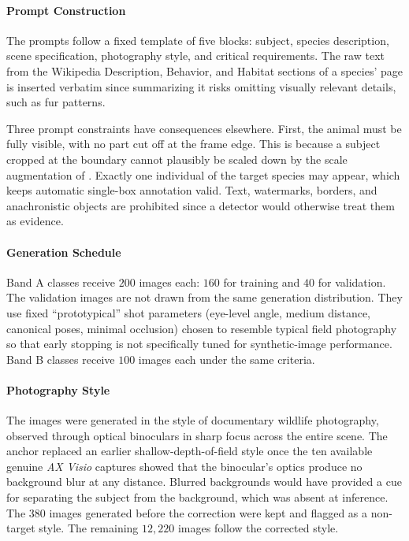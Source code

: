 \paragraph{Prompt Construction}
The prompts follow a fixed template of five blocks: subject, species description, scene specification, photography style, and critical requirements. The raw text from the Wikipedia Description, Behavior, and Habitat sections of a species' page is inserted verbatim since summarizing it risks omitting visually relevant details, such as fur patterns.

Three prompt constraints have consequences elsewhere. First, the animal must be fully visible, with no part cut off at the frame edge. This is because a subject cropped at the boundary cannot plausibly be scaled down by the scale augmentation of . Exactly one individual of the target species may appear, which keeps automatic single-box annotation valid. Text, watermarks, borders, and anachronistic objects are prohibited since a detector would otherwise treat them as evidence.

\paragraph{Generation Schedule}
Band A classes receive $200$ images each: $160$ for training and $40$ for validation. The validation images are not drawn from the same generation distribution. They use fixed \enquote{prototypical} shot parameters (eye-level angle, medium distance, canonical poses, minimal occlusion) chosen to resemble typical field photography so that early stopping is not specifically tuned for synthetic-image performance. Band B classes receive $100$ images each under the same criteria.

\paragraph{Photography Style}
The images were generated in the style of documentary wildlife photography, observed through optical binoculars in sharp focus across the entire scene. The anchor replaced an earlier shallow-depth-of-field style once the ten available genuine \textit{AX Visio} captures showed that the binocular's optics produce no background blur at any distance.  %
Blurred backgrounds would have provided a cue for separating the subject from the background, which was absent at inference. The $380$ images generated before the correction were kept and flagged as a non-target style. The remaining $12{,}220$ images follow the corrected style.

